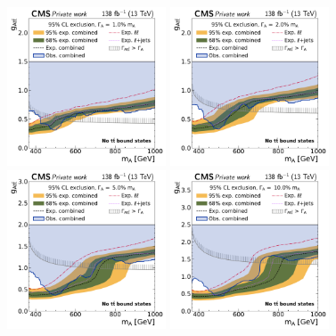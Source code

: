 \begin{figure}[!ph]
    \centering
    \includegraphics[width=0.42\textwidth]{figures/ah/limits_combined/smtt/A_limit_w1p0_g-scan.pdf}%
    \hspace*{0.05\textwidth}%
    \includegraphics[width=0.42\textwidth]{figures/ah/limits_combined/smtt/A_limit_w2p0_g-scan.pdf} \\
    \includegraphics[width=0.42\textwidth]{figures/ah/limits_combined/smtt/A_limit_w5p0_g-scan.pdf}%
    \hspace*{0.05\textwidth}%
    \includegraphics[width=0.42\textwidth]{figures/ah/limits_combined/smtt/A_limit_w10p0_g-scan.pdf}

\end{figure}
